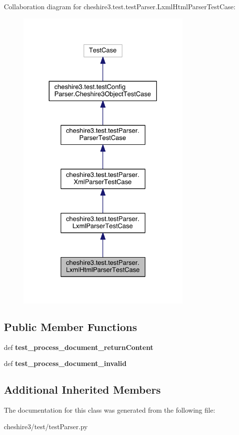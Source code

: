 Collaboration diagram for cheshire3.\-test.\-test\-Parser.\-Lxml\-Html\-Parser\-Test\-Case\-:
\nopagebreak
\begin{figure}[H]
\begin{center}
\leavevmode
\includegraphics[width=246pt]{classcheshire3_1_1test_1_1test_parser_1_1_lxml_html_parser_test_case__coll__graph}
\end{center}
\end{figure}
\subsection*{Public Member Functions}
\begin{DoxyCompactItemize}
\item 
\hypertarget{classcheshire3_1_1test_1_1test_parser_1_1_lxml_html_parser_test_case_a3b4fb719cc5fa5b5a36eb4cc635686c7}{def {\bfseries test\-\_\-process\-\_\-document\-\_\-return\-Content}}\label{classcheshire3_1_1test_1_1test_parser_1_1_lxml_html_parser_test_case_a3b4fb719cc5fa5b5a36eb4cc635686c7}

\item 
\hypertarget{classcheshire3_1_1test_1_1test_parser_1_1_lxml_html_parser_test_case_a44474bf6eb45bb926b55590f5c94a8b9}{def {\bfseries test\-\_\-process\-\_\-document\-\_\-invalid}}\label{classcheshire3_1_1test_1_1test_parser_1_1_lxml_html_parser_test_case_a44474bf6eb45bb926b55590f5c94a8b9}

\end{DoxyCompactItemize}
\subsection*{Additional Inherited Members}


The documentation for this class was generated from the following file\-:\begin{DoxyCompactItemize}
\item 
cheshire3/test/test\-Parser.\-py\end{DoxyCompactItemize}
